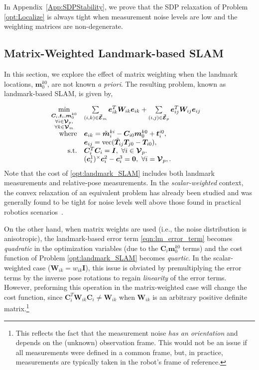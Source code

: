 \documentclass[lettersize,journal]{IEEEtran}
\newcommand{\EdgeSet}{\vec{\bm{\mathcal{E}}}}
\newcommand{\VertSetP}{\bm{\mathcal{V}}_p}
\newcommand{\VertSetM}{\bm{\mathcal{V}}_m}
\newcommand{\vect}[1]{\mbox{vec}(#1)}
\begin{document}
In Appendix~\ref{App:SDPStability}, we prove that the SDP relaxation of Problem \eqref{opt:Localize} is always tight when measurement noise levels are low and the weighting matrices are non-degenerate.

\subsection{Matrix-Weighted Landmark-based SLAM}\label{sec:SLAM}

In this section, we explore the effect of matrix weighting when the landmark locations, $\bm{m}_0^{k0}$, are not known \emph{a priori}. The resulting problem, known as landmark-based SLAM, is given by,

\begin{equation}
	\label{opt:landmark_SLAM}
	\hspace*{-10pt}\begin{array}{rl}
		\min\limits_{\substack{\bm{C}_i,\bm{t}_i, \bm{m}_0^{k0}\\ \forall i\in \VertSetP,\\ \forall k\in\VertSetM } } &\sum\limits_{(i,k)\in\EdgeSet_m}  \bm{e}_{ik}^T \bm{W}_{ik} \bm{e}_{ik} +\sum\limits_{(i,j)\in\EdgeSet_p}  \bm{e}_{ij}^T \bm{W}_{ij} \bm{e}_{ij}\\
		\mbox{where} & \bm{e}_{ik} = \tilde{\bm{m}}_i^{ki} - \bm{C}_{i0}\bm{m}_0^{k0} + \bm{t}_i^{i0} , \\
		&\bm{e}_{ij} = \vect{\tilde{\bm{T}}_{ij}\bm{T}_{j0} - \bm{T}_{i0}}, \\
		\mbox{s.t.} &\bm{C}_i^T \bm{C}_i = \bm{I},~\forall i \in \VertSetP.\\
		& (\bm{c}_i^{1})^\times\bm{c}_i^{2} - \bm{c}_i^{3} = \bm{0},~\forall i = \VertSetP,.
	\end{array}
\end{equation}
Note that the cost of \eqref{opt:landmark_SLAM} includes both landmark measurements and relative-pose measurements.
In the \emph{scalar-weighted} context, the convex relaxation of an equivalent problem has already been studied and was generally found to be tight for noise levels well above those found in practical robotics scenarios~\cite{holmesEfficientGlobalOptimality2023}. 

On the other hand, when matrix weights are used (i.e., the noise distribution is anisotropic), the landmark-based error term \eqref{eqn:lm_error_term} becomes \emph{quadratic} in the optimization variables (due to the $\bm{C}_i\bm{m}_0^{k0}$ terms) and the cost function of Problem \eqref{opt:landmark_SLAM} becomes \emph{quartic}. In the scalar-weighted case ($\bm{W}_{ik} = w_{ik}\bm{I}$), this issue is obviated by premultiplying the error terms by the inverse pose rotations to regain \emph{linearity} of the error terms. However, preforming this operation in the matrix-weighted case will change the cost function, since $\bm{C}_i^T\bm{W}_{ik}\bm{C}_i\neq \bm{W}_{ik}$ when $\bm{W}_{ik}$ is an arbitrary positive definite matrix.\footnote{This reflects the fact that the measurement noise \emph{has an orientation} and depends on the (unknown) observation frame. This would not be an issue if all measurements were defined in a common frame, but, in practice, measurements are typically taken in the robot's frame of reference.}
\end{document}
